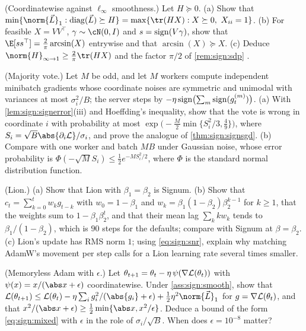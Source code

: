 \begin{refsection}
\begin{exercises}
\item \consolidation\harder (Coordinatewise against $\ell_\infty$ smoothness.)\label{ex:sign:sdp} Let $H\succeq0$. (a) Show that $\min\{\norm{\vec L}_1:\diag(\vec L)\succeq H\}=\max\{\tr(HX):X\succeq0,\ X_{ii}=1\}$. (b) For feasible $X=VV^\top$, $\gamma\sim\cN(0,I)$ and $s=\operatorname{sign}(V\gamma)$, show that $\E[ss^\top]=\frac2\pi\arcsin(X)$ entrywise and that $\arcsin(X)\succeq X$. (c) Deduce $\norm{H}_{\infty\to1}\ge\frac2\pi\tr(HX)$ and the factor $\pi/2$ of \cref{rem:sign:sdp} \parencite{Nesterov1998}. 

\item \variation (Majority vote.)\label{ex:sign:vote} Let $M$ be odd, and let $M$ workers compute independent minibatch gradients whose coordinate noises are symmetric and unimodal with variances at most $\sigma_i^2/B$; the server steps by $-\eta\operatorname{sign}\bigl(\sum_m\operatorname{sign}(g^{(m)}_{t})\bigr)$. (a) With \cref{lem:sign:signerror}(iii) and Hoeffding's inequality, show that the vote is wrong in coordinate $i$ with probability at most $\exp\bigl(-\frac M2\min\{S_i^2/3,\frac49\}\bigr)$, where $S_i=\sqrt B\abs{\partial_i\Loss}/\sigma_i$, and prove the analogue of \cref{thm:sign:signsgd}. (b) Compare with one worker and batch $MB$ under Gaussian noise, whose error probability is $\Phi(-\sqrt MS_i)\le\frac12e^{-MS_i^2/2}$, where $\Phi$ is the standard normal distribution function.

\item \variation (Lion.)\label{ex:sign:lion} (a) Show that Lion with $\beta_1=\beta_2$ is Signum. (b) Show that $c_t=\sum_{k=0}^tw_kg_{t-k}$ with $w_0=1-\beta_1$ and $w_k=\beta_1(1-\beta_2)\beta_2^{k-1}$ for $k\ge1$, that the weights sum to $1-\beta_1\beta_2^t$, and that their mean lag $\sum_kkw_k$ tends to $\beta_1/(1-\beta_2)$, which is $90$ steps for the defaults; compare with Signum at $\beta=\beta_2$. (c) Lion's update has RMS norm $1$; using \eqref{eq:sign:snr}, explain why matching AdamW's movement per step calls for a Lion learning rate several times smaller.

\item \variation (Memoryless Adam with $\epsilon$.)\label{ex:sign:epsilon} Let $\theta_{t+1}=\theta_t-\eta\,\psi(\nabla\mathcal{L}(\theta_t))$ with $\psi(x)=x/(\abs x+\epsilon)$ coordinatewise. Under \cref{ass:sign:smooth}, show that $\Loss(\theta_{t+1})\le\Loss(\theta_t)-\eta\sum_ig_i^2/(\abs{g_i}+\epsilon)+\frac12\eta^2\norm{\vec L}_1$ for $g=\nabla\mathcal{L}(\theta_t)$, and that $x^2/(\abs x+\epsilon)\ge\frac12\min\{\abs x,x^2/\epsilon\}$. Deduce a bound of the form \eqref{eq:sign:mixed} with $\epsilon$ in the role of $\sigma_i/\sqrt B$. When does $\epsilon=10^{-8}$ matter?


\end{exercises}
\end{refsection}
